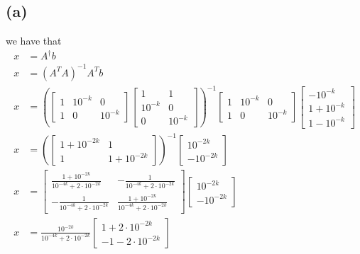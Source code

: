 \subsection*{(a)}
we have that 
\begin{align*}
    x&=A^{\dagger}b\\
    x&=(A^TA)^{-1}A^Tb\\
    x&=\left(\begin{bmatrix}
        1 & 10^{-k} & 0\\
        1 & 0 & 10^{-k}
    \end{bmatrix}
    \begin{bmatrix}
        1 & 1\\
        10^{-k} & 0\\
        0 & 10^{-k}
    \end{bmatrix}\right)^{-1}
    \begin{bmatrix}
        1 & 10^{-k} & 0\\
        1 & 0 & 10^{-k}
    \end{bmatrix}
    \begin{bmatrix}
        -10^{-k}\\
        1+10^{-k}\\
        1-10^{-k}
    \end{bmatrix}\\
    x&=\left(\begin{bmatrix}
        1+10^{-2k} & 1\\
        1 & 1+10^{-2k}
    \end{bmatrix}\right)^{-1}\begin{bmatrix}
        10^{-2k}\\
        -10^{-2k}
    \end{bmatrix}\\
    x&=\begin{bmatrix}\frac{1+10^{-2k}}{10^{-4k}+2\cdot10^{-2k}}&-\frac{1}{10^{-4k}+2\cdot10^{-2k}}\\ -\frac{1}{10^{-4k}+2\cdot10^{-2k}}&\frac{1+10^{-2k}}{10^{-4k}+2\cdot10^{-2k}}
    \end{bmatrix}\begin{bmatrix}
        10^{-2k}\\
        -10^{-2k}
    \end{bmatrix}\\
    x&=\frac{10^{-2k}}{10^{-4k}+2\cdot10^{-2k}}\begin{bmatrix}
        1+2\cdot10^{-2k}\\
        -1-2\cdot10^{-2k}
    \end{bmatrix}
\end{align*}
